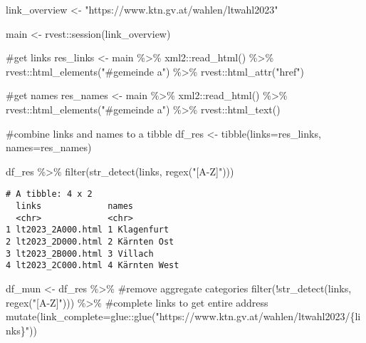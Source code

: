 \documentclass[
  letterpaper,
  DIV=11,
  numbers=noendperiod,
  oneside]{scrartcl}
\newenvironment{Shaded}{\begin{snugshade}}{\end{snugshade}}
\newcommand{\AttributeTok}[1]{\textcolor[rgb]{0.40,0.45,0.13}{#1}}
\newcommand{\CommentTok}[1]{\textcolor[rgb]{0.37,0.37,0.37}{#1}}
\newcommand{\FunctionTok}[1]{\textcolor[rgb]{0.28,0.35,0.67}{#1}}
\newcommand{\NormalTok}[1]{\textcolor[rgb]{0.00,0.23,0.31}{#1}}
\newcommand{\OtherTok}[1]{\textcolor[rgb]{0.00,0.23,0.31}{#1}}
\newcommand{\SpecialCharTok}[1]{\textcolor[rgb]{0.37,0.37,0.37}{#1}}
\newcommand{\StringTok}[1]{\textcolor[rgb]{0.13,0.47,0.30}{#1}}
\begin{document}
\begin{Shaded}
\begin{Highlighting}[]
\NormalTok{link\_overview }\OtherTok{\textless{}{-}} \StringTok{"https://www.ktn.gv.at/wahlen/ltwahl2023"}

\NormalTok{main }\OtherTok{\textless{}{-}}\NormalTok{ rvest}\SpecialCharTok{::}\FunctionTok{session}\NormalTok{(link\_overview)}

\CommentTok{\#get links}
\NormalTok{res\_links }\OtherTok{\textless{}{-}}\NormalTok{ main }\SpecialCharTok{\%\textgreater{}\%}\NormalTok{ xml2}\SpecialCharTok{::}\FunctionTok{read\_html}\NormalTok{() }\SpecialCharTok{\%\textgreater{}\%} 
\NormalTok{  rvest}\SpecialCharTok{::}\FunctionTok{html\_elements}\NormalTok{(}\StringTok{"\#gemeinde a"}\NormalTok{) }\SpecialCharTok{\%\textgreater{}\%} 
\NormalTok{  rvest}\SpecialCharTok{::}\FunctionTok{html\_attr}\NormalTok{(}\StringTok{"href"}\NormalTok{)}

\CommentTok{\#get names}
\NormalTok{res\_names }\OtherTok{\textless{}{-}}\NormalTok{ main }\SpecialCharTok{\%\textgreater{}\%}\NormalTok{ xml2}\SpecialCharTok{::}\FunctionTok{read\_html}\NormalTok{() }\SpecialCharTok{\%\textgreater{}\%} 
\NormalTok{  rvest}\SpecialCharTok{::}\FunctionTok{html\_elements}\NormalTok{(}\StringTok{"\#gemeinde a"}\NormalTok{) }\SpecialCharTok{\%\textgreater{}\%} 
\NormalTok{  rvest}\SpecialCharTok{::}\FunctionTok{html\_text}\NormalTok{()}

\CommentTok{\#combine links and names to a tibble}
\NormalTok{df\_res }\OtherTok{\textless{}{-}} \FunctionTok{tibble}\NormalTok{(}\AttributeTok{links=}\NormalTok{res\_links, }\AttributeTok{names=}\NormalTok{res\_names)}

\NormalTok{df\_res }\SpecialCharTok{\%\textgreater{}\%} 
  \FunctionTok{filter}\NormalTok{(}\FunctionTok{str\_detect}\NormalTok{(links, }\FunctionTok{regex}\NormalTok{(}\StringTok{"[A{-}Z]"}\NormalTok{)))}
\end{Highlighting}
\end{Shaded}

\begin{verbatim}
# A tibble: 4 x 2
  links             names         
  <chr>             <chr>         
1 lt2023_2A000.html 1 Klagenfurt  
2 lt2023_2D000.html 2 Kärnten Ost 
3 lt2023_2B000.html 3 Villach     
4 lt2023_2C000.html 4 Kärnten West
\end{verbatim}

\begin{Shaded}
\begin{Highlighting}[]
\NormalTok{df\_mun }\OtherTok{\textless{}{-}}\NormalTok{ df\_res }\SpecialCharTok{\%\textgreater{}\%} 
  \CommentTok{\#remove aggregate categories}
  \FunctionTok{filter}\NormalTok{(}\SpecialCharTok{!}\FunctionTok{str\_detect}\NormalTok{(links, }\FunctionTok{regex}\NormalTok{(}\StringTok{"[A{-}Z]"}\NormalTok{))) }\SpecialCharTok{\%\textgreater{}\%} 
  \CommentTok{\#complete links to get entire address}
  \FunctionTok{mutate}\NormalTok{(}\AttributeTok{link\_complete=}\NormalTok{glue}\SpecialCharTok{::}\FunctionTok{glue}\NormalTok{(}\StringTok{"https://www.ktn.gv.at/wahlen/ltwahl2023/\{links\}"}\NormalTok{))}
\end{Highlighting}
\end{Shaded}
\end{document}
